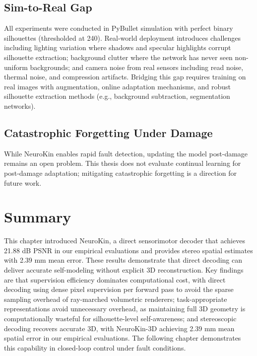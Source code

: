 \documentclass[12pt,a4paper,oneside]{report}
\begin{document}
\subsection{Sim-to-Real Gap}
\label{subsec:sim_to_real_gap}

All experiments were conducted in PyBullet simulation with perfect binary silhouettes (thresholded at 240). Real-world deployment introduces challenges including lighting variation where shadows and specular highlights corrupt silhouette extraction; background clutter where the network has never seen non-uniform backgrounds; and camera noise from real sensors including read noise, thermal noise, and compression artifacts. Bridging this gap requires training on real images with augmentation, online adaptation mechanisms, and robust silhouette extraction methods (e.g., background subtraction, segmentation networks).

\subsection{Catastrophic Forgetting Under Damage}
\label{subsec:catastrophic_forgetting_under_damage}

While NeuroKin enables rapid fault detection, updating the model post-damage remains an open problem. This thesis does not evaluate continual learning for post-damage adaptation; mitigating catastrophic forgetting is a direction for future work.

\section{Summary}

This chapter introduced NeuroKin, a direct sensorimotor decoder that achieves 21.88 dB PSNR in our empirical evaluations and provides stereo spatial estimates with 2.39 mm mean error. These results demonstrate that direct decoding can deliver accurate self-modeling without explicit 3D reconstruction. Key findings are that supervision efficiency dominates computational cost, with direct decoding using dense pixel supervision per forward pass to avoid the sparse sampling overhead of ray-marched volumetric renderers; task-appropriate representations avoid unnecessary overhead, as maintaining full 3D geometry is computationally wasteful for silhouette-level self-awareness; and stereoscopic decoding recovers accurate 3D, with NeuroKin-3D achieving 2.39 mm mean spatial error in our empirical evaluations. The following chapter demonstrates this capability in closed-loop control under fault conditions.
\end{document}
